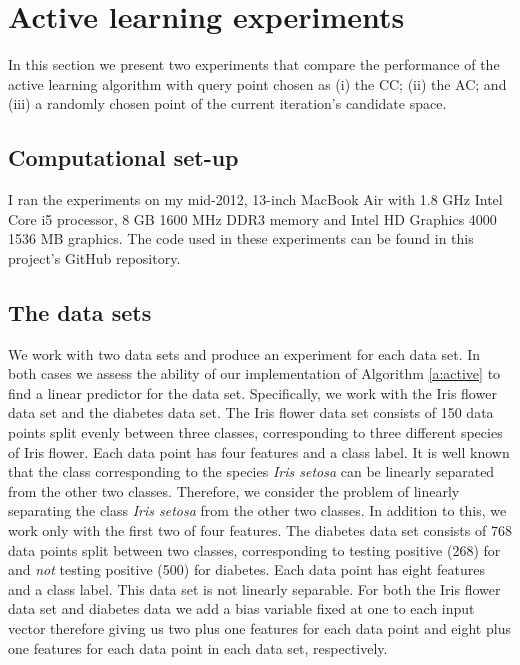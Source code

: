 \documentclass[11pt]{amsart}
\theoremstyle{definition}
\theoremstyle{remark}
\begin{document}
\section{Active learning experiments}
    In this section we present two experiments that compare the performance of the active learning algorithm with query point chosen as (i) the CC; (ii) the AC; and (iii) a randomly chosen point of the current iteration's candidate space. 

    \subsection{Computational set-up} 
        I ran the experiments on my mid-2012, 13-inch MacBook Air with 1.8 GHz Intel Core i5 processor, 8 GB 1600 MHz DDR3 memory and Intel HD Graphics 4000 1536 MB graphics. The code used in these experiments can be found in this project's GitHub repository.

    \subsection{The data sets} 
        We work with two data sets and produce an experiment for each data set. In both cases we assess the ability of our implementation of Algorithm \ref{a:active} to find a linear predictor for the data set. 
        Specifically, we work with the Iris flower data set and the diabetes data set. The Iris flower data set consists of 150 data points split evenly between three classes, corresponding to three different species of Iris flower. Each data point has four features and a class label. It is well known that the class corresponding to the species \emph{Iris setosa} can be linearly separated from the other two classes. Therefore, we consider the problem of linearly separating the class \emph{Iris setosa} from the other two classes. In addition to this, we work only with the first two of four features. The diabetes data set consists of 768 data points split between two classes, corresponding to testing positive (268) for  and \emph{not} testing positive (500) for diabetes. Each data point has eight features and a class label. This data set is not linearly separable. For both the Iris flower data set and diabetes data we add a bias variable fixed at one to each input vector therefore giving us two plus one features for each data point and eight plus one features for each data point in each data set, respectively.  
\end{document}
